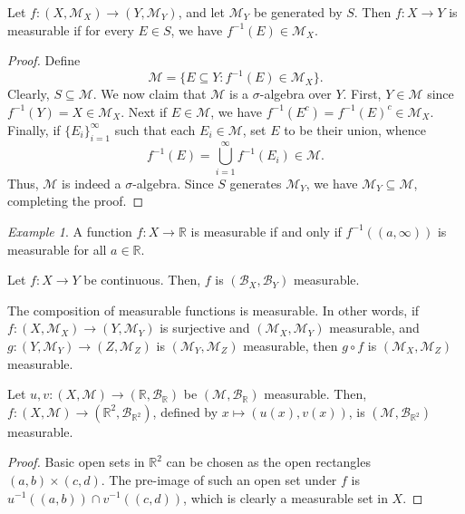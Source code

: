 \documentclass[11pt]{article}
\newcommand{\R}{\mathbb{R}}
\newcommand{\M}{\mathcal{M}}
\theoremstyle{definition}
\theoremstyle{remark}
\newtheorem*{example}{Example}
\numberwithin{equation}{section}
\begin{document}
    \begin{lemma}
        Let $f\colon (X, \M_X) \to (Y, \M_Y)$, and let $\M_Y$ be generated by $S$.
        Then $f\colon X\to Y$ is measurable if for every $E \in S$, we have
        $f^{-1}(E) \in \M_X$.
    \end{lemma}
    \begin{proof}
        Define \[
            \M = \{E \subseteq Y: f^{-1}(E) \in \M_X\}.
        \] Clearly, $S \subseteq \M$. We now claim that $\M$ is a $\sigma$-algebra
        over $Y$. First, $Y \in \M$ since $f^{-1}(Y) = X \in \M_X$. Next if $E \in
        \M$, we have $f^{-1}(E^c) = f^{-1}(E)^c \in \M_X$. Finally, if $\{E_i\}_{i =
        1}^\infty$ such that each $E_i \in \M$, set $E$ to be their union, whence \[
            f^{-1}(E) = \bigcup_{i = 1}^\infty f^{-1}(E_i) \in \M.
        \] Thus, $\M$ is indeed a $\sigma$-algebra. Since $S$ generates $\M_Y$, we
        have $\M_Y \subseteq \M$, completing the proof.
    \end{proof}
    \begin{example}
        A function $f\colon X \to \R$ is measurable if and only if $f^{-1}((a,
        \infty))$ is measurable for all $a \in \R$.
    \end{example}


    \begin{theorem}
        Let $f\colon X \to Y$ be continuous. Then, $f$ is $(\mathcal{B}_X,
        \mathcal{B}_Y)$ measurable.
    \end{theorem}

    \begin{lemma}
        The composition of measurable functions is measurable. In other words, if
        $f\colon (X, \M_X) \to (Y, \M_Y)$ is surjective and $(\M_X, \M_Y)$
        measurable, and $g\colon (Y, \M_Y) \to (Z, \M_Z)$ is $(\M_Y, \M_Z)$
        measurable, then $g\circ f$ is $(\M_X, \M_Z)$ measurable.
    \end{lemma}

    \begin{lemma}
        Let $u, v\colon (X, \M) \to (\R, \mathcal{B}_\R)$ be $(\M, \mathcal{B}_\R)$
        measurable. Then, $f\colon (X, \M) \to (\R^2, \mathcal{B}_{\R^2})$, defined
        by $x \mapsto (u(x), v(x))$, is $(\M, \mathcal{B}_{\R^2})$ measurable.
    \end{lemma}
    \begin{proof}
        Basic open sets in $\R^2$ can be chosen as the open rectangles $(a, b) \times
        (c, d)$. The pre-image of such an open set under $f$ is $u^{-1}((a, b)) \cap
        v^{-1}((c, d))$, which is clearly a measurable set in $X$.
    \end{proof}
\end{document}
